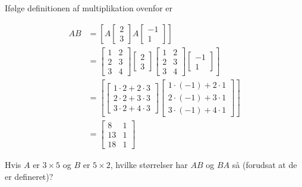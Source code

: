 \begin{solution}
    Ifølge definitionen af multiplikation ovenfor er

\[
\begin{aligned}
A B & =\left[A\left[\begin{array}{l}
2 \\
3
\end{array}\right] A\left[\begin{array}{c}
-1 \\
1
\end{array}\right]\right] \\
& \left.=\left[\begin{array}{ll}
1 & 2 \\
2 & 3 \\
3 & 4
\end{array}\right]\left[\begin{array}{l}
2 \\
3
\end{array}\right]\left[\begin{array}{ll}
1 & 2 \\
2 & 3 \\
3 & 4
\end{array}\right]\left[\begin{array}{c}
-1 \\
1
\end{array}\right]\right] \\
& =\left[\left[\begin{array}{l}
1 \cdot 2+2 \cdot 3 \\
2 \cdot 2+3 \cdot 3 \\
3 \cdot 2+4 \cdot 3
\end{array}\right]\left[\begin{array}{l}
1 \cdot(-1)+2 \cdot 1 \\
2 \cdot(-1)+3 \cdot 1 \\
3 \cdot(-1)+4 \cdot 1
\end{array}\right]\right] \\
& =\left[\begin{array}{cc}
8 & 1 \\
13 & 1 \\
18 & 1
\end{array}\right]
\end{aligned}
\]
\end{solution}

\begin{example} Hvis $A$ er $3 \times 5$ og $B$ er $5 \times 2$, hvilke størrelser har $A B$ og $B A$ så (forudsat at de er defineret)?
\end{example}

